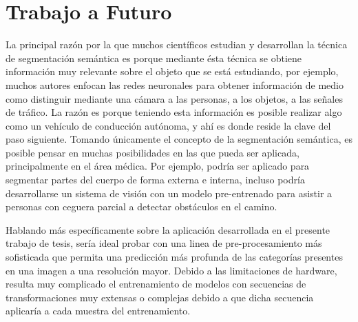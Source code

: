 \section{Trabajo a Futuro}
La principal razón por la que muchos científicos estudian y desarrollan la técnica de segmentación semántica es porque mediante ésta técnica se obtiene información muy relevante sobre el objeto que se está estudiando, por ejemplo, muchos autores enfocan las redes neuronales para obtener información de medio como distinguir mediante una cámara a las personas, a los objetos, a las señales de tráfico. La razón es porque teniendo esta información es posible realizar algo como un vehículo de conducción autónoma, y ahí es donde reside la clave del paso siguiente. Tomando únicamente el concepto de la segmentación semántica, es posible pensar en muchas posibilidades en las que pueda ser aplicada, principalmente en el área médica. Por ejemplo, podría ser aplicado para segmentar partes del cuerpo de forma externa e interna, incluso podría desarrollarse un sistema de visión con un modelo pre-entrenado para asistir a personas con ceguera parcial a detectar obstáculos en el camino.


Hablando más específicamente sobre la aplicación desarrollada en el presente trabajo de tesis, sería ideal probar con una linea de pre-procesamiento más sofisticada que permita una predicción más profunda de las categorías presentes en una imagen a una resolución mayor. Debido a las limitaciones de hardware, resulta muy complicado el entrenamiento de modelos con secuencias de transformaciones muy extensas o complejas debido a que dicha secuencia aplicaría a cada muestra del entrenamiento. 

\nocite{*}